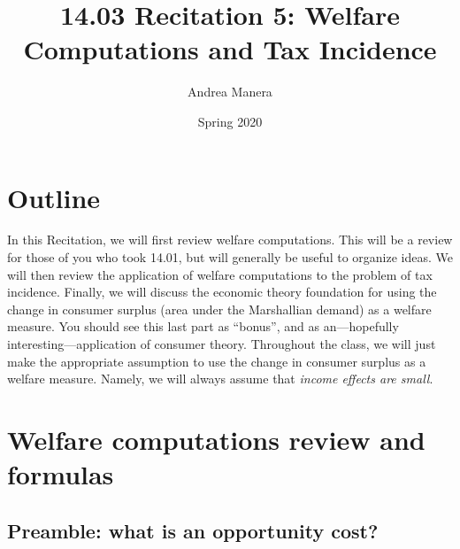 \documentclass[11pt,english]{article}
\title{14.03 Recitation 5: Welfare Computations and Tax Incidence}
\author{Andrea Manera}
\date{Spring 2020}
\begin{document}
\maketitle

\section*{Outline}
In this Recitation, we will first review welfare computations. This will be a review for those of you who took 14.01, but will generally be useful to organize ideas. We will then review the application of welfare computations to the problem of tax incidence. Finally, we will discuss the economic theory foundation for using the change in consumer surplus (area under the Marshallian demand) as a welfare measure. You should see this last part as ``bonus'', and as an---hopefully interesting---application of consumer theory. Throughout the class, we will just make the appropriate assumption to use the change in consumer surplus as a welfare measure. Namely, we will always assume that \emph{income effects are small}.

\setcounter{section}{0}

\section{Welfare computations review and formulas}

\subsection{Preamble: what is an opportunity cost?}
\end{document}
